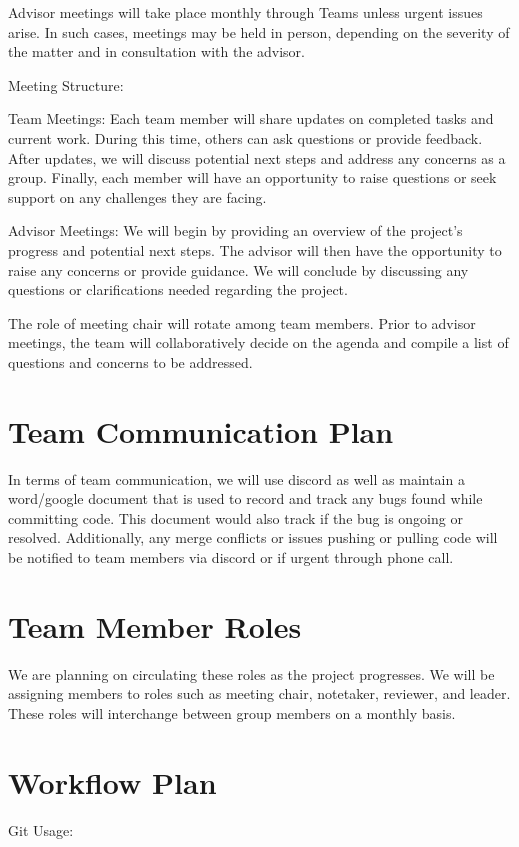 \documentclass{article}
\begin{document}
Advisor meetings will take place monthly through Teams unless urgent issues arise. In such cases, meetings may be held in person, depending on the severity of the matter and in consultation with the advisor.

Meeting Structure:

Team Meetings: Each team member will share updates on completed tasks and current work. During this time, others can ask questions or provide feedback. After updates, we will discuss potential next steps and address any concerns as a group. Finally, each member will have an opportunity to raise questions or seek support on any challenges they are facing.

Advisor Meetings: We will begin by providing an overview of the project’s progress and potential next steps. The advisor will then have the opportunity to raise any concerns or provide guidance. We will conclude by discussing any questions or clarifications needed regarding the project.

The role of meeting chair will rotate among team members. Prior to advisor meetings, the team will collaboratively decide on the agenda and compile a list of questions and concerns to be addressed.

\section{Team Communication Plan}
In terms of team communication, we will use discord as well as maintain a word/google document that is used to record and track any bugs found while committing code. This document would also track if the bug is ongoing or resolved. Additionally, any merge conflicts or issues pushing or pulling code will be notified to team members via discord or if urgent through phone call.


\section{Team Member Roles}
We are planning on circulating these roles as the project progresses. We will be assigning members to roles such as meeting chair, notetaker, reviewer, and leader. These roles will interchange between group members on a monthly basis.


\section{Workflow Plan}
Git Usage:
\end{document}

